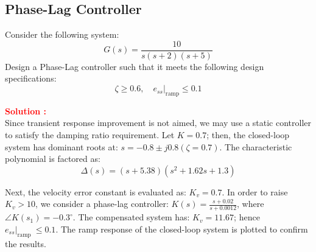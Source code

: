\documentclass[12pt]{article}
\begin{document}
\clearpage

\subsection{Phase-Lag Controller}

Consider the following system:
$$G(s)=\frac{10}{s(s+2)(s+5)}$$ 
Design a Phase-Lag controller such that it meets the following design specifications: 
$$\zeta \geq 0.6,\left.\quad e_{s s}\right|_{\mathrm{ramp}} \leq 0.1$$

\textbf{\textcolor{red}{Solution :}} \\
Since transient response improvement is not aimed, we may use a static controller to satisfy the damping ratio requirement. Let $K=0.7$; then, the closed-loop system has dominant roots at: $s=-0.8 \pm j 0.8(\zeta=0.7)$. The characteristic polynomial is factored as: 
$$\Delta(s)=(s+5.38)\left(s^2+1.62 s+1.3\right)$$

Next, the velocity error constant is evaluated as: $K_v=0.7$. In order to raise $K_v>10$, we consider a phase-lag controller: $K(s)=\frac{s+0.02}{s+0.0012}$, where $\angle K\left(s_1\right)=-0.3^{\circ}$. The compensated system has: $K_v=11.67$; hence $\left.e_{s s}\right|_{\text {ramp }} \leq 0.1$. The ramp response of the closed-loop system is plotted to confirm the results.
\end{document}
